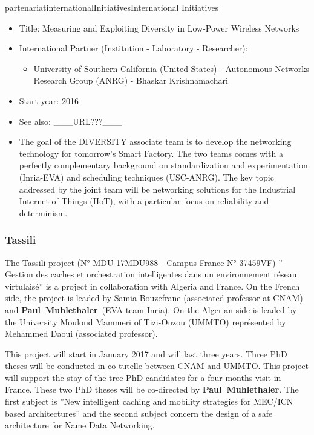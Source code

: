 \documentclass{ra2016}
\newcommand{\paul}             {\textbf{Paul~Muhlethaler}}
\begin{document}
\begin{module}{partenariat}{internationalInitiatives}{International Initiatives}
\begin{itemize}
 \item Title: Measuring and Exploiting Diversity in Low-Power Wireless Networks
 \item International Partner (Institution -  Laboratory - Researcher):
 \begin{itemize}
    \item University of Southern California (United States)  
 - Autonomous Networks Research Group (ANRG) - Bhaskar Krishnamachari
 \end{itemize}
 \item Start year: 2016\item See also: \_\_\_URL???\_\_\_
 \item The goal of the DIVERSITY associate team is to develop the networking technology for tomorrow's Smart Factory. The two teams comes with a perfectly complementary background on standardization and experimentation (Inria-EVA) and scheduling techniques (USC-ANRG). The key topic addressed by the joint team will be networking solutions for the Industrial Internet of Things (IIoT), with a particular focus on reliability and determinism. 
\end{itemize}

\subsubsection{Tassili}

The Tassili project (N° MDU 17MDU988  - Campus France  N° 37459VF) '' Gestion des caches et orchestration intelligentes dans un environnement réseau virtulaisé'' is a project in collaboration with Algeria and France.
On the French side, the project is leaded by Samia Bouzefrane (associated professor at CNAM) and \paul~(EVA team Inria).
On the Algerian side is leaded by the University Mouloud Mammeri of Tizi-Ouzou (UMMTO) représented by Mehammed Daoui (associated professor).

This project will start in January 2017 and will last three years. Three PhD theses will be conducted in co-tutelle between CNAM and UMMTO.
This project will support the stay of the tree PhD candidates for  a four months visit in France.
These two PhD theses will be co-directed by \paul.
The first subject is ''New intelligent caching and mobility strategies for MEC/ICN based architectures'' and the second subject concern the design of a safe  architecture for Name Data Networking.


\end{module}
\end{document}
